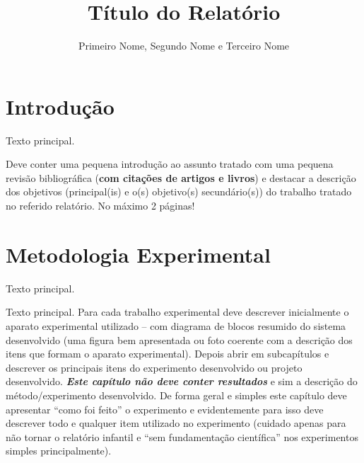 \documentclass[12pt]{eng04457}
\begin{document}
\ano{\the\year} %
\title{Título do Relatório}
\author{Primeiro Nome, Segundo Nome e Terceiro Nome}


\maketitle 

\section{Introdução}
Texto principal.

Deve conter uma pequena introdução ao assunto tratado com uma pequena revisão bibliográfica (\textbf{com citações de artigos e livros}) e destacar a descrição dos objetivos (principal(is) e o(s) objetivo(s) secundário(s)) do trabalho tratado no referido relatório. No máximo 2 páginas!

\section{Metodologia Experimental}

Texto principal.

Texto principal. Para cada trabalho experimental deve descrever inicialmente o aparato experimental utilizado – com diagrama de blocos resumido do sistema desenvolvido (uma figura bem apresentada ou foto coerente com a descrição dos itens que formam o aparato experimental). Depois abrir em subcapítulos e descrever os principais itens do experimento desenvolvido ou projeto desenvolvido. \textit{\textbf{Este capítulo não deve conter resultados}} e sim a descrição do método/experimento desenvolvido. De forma geral e simples este capítulo deve apresentar “como foi feito” o experimento e evidentemente para isso deve descrever todo e qualquer item utilizado no experimento (cuidado apenas para não tornar o relatório infantil e “sem fundamentação científica” nos experimentos simples principalmente).
\end{document}
